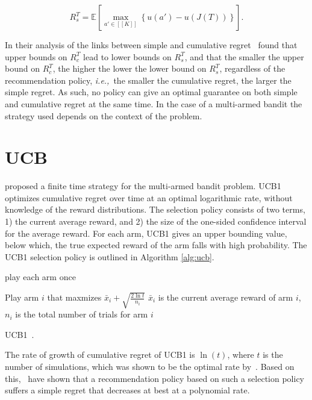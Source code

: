 \documentclass{kecsmstr}
\newcommand{\bE}{\mathbb{E}}
\newcommand{\ie}{{\it i.e.,}~}
\begin{document}
\begin{equation}
R_s^T = \bE \left[  \max_{a' \in [[K]]} \left\{ u(a') - u(J(T)) \right\} \right].
\end{equation}

In their analysis of the links between simple and cumulative regret~ found that upper bounds on $R_c^T$ lead to lower bounds on $R_s^T$, and that the smaller the upper bound on $R_c^T$, the higher the lower the lower bound on $R_s^T$, regardless of the recommendation policy, \ie the smaller the cumulative regret, the larger the simple regret. As such, no policy can give an optimal guarantee on both simple and cumulative regret at the same time. In the case of a multi-armed bandit the strategy used depends on the context of the problem.

\section{UCB}
\label{sec:ucb}

 proposed a finite time strategy for the multi-armed bandit problem. UCB1 optimizes cumulative regret over time at an optimal logarithmic rate, without knowledge of the reward distributions. The selection policy consists of two terms, 1) the current average reward, and 2) the size of the one-sided confidence interval for the average reward. For each arm, UCB1 gives an upper bounding value, below which, the true expected reward of the arm falls with high probability. The UCB1 selection policy is outlined in Algorithm \ref{alg:ucb}.

\IncMargin{1em}
\begin{algorithm2e}[ht]
	\Indm
	\vspace{0.2cm}
	\Indp

	play each arm once 																				\;

	 {
		Play arm $i$ that maxmizes $\bar{x}_i + \displaystyle\sqrt{\frac{2\ln{t}}{n_i}}$ \newline
		$\bar{x}_i$ is the current average reward of arm $i$, $n_i$ is the total number of trials for arm $i$ \;
	}

  \caption{UCB1~\protect{}. \label{alg:ucb}}
\end{algorithm2e}
\DecMargin{1em}

The rate of growth of cumulative regret of UCB1 is $\ln(t)$, where $t$ is the number of simulations, which was shown to be the optimal rate by~. Based on this,~ have shown that a recommendation policy based on such a selection policy suffers a simple regret that decreases at best at a polynomial rate. 
\end{document}
